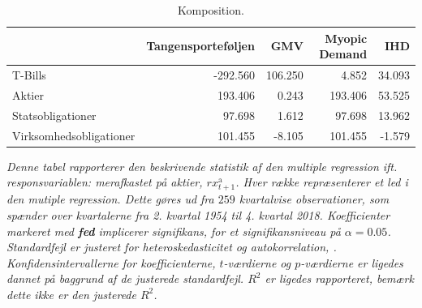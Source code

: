 \documentclass[
  a4paper,
  oneside]{memoir}
\begin{document}
\begin{table}[H]

\caption{\label{tab:AL-KOMP}Komposition.}
\centering
\begin{threeparttable}
\begin{tabular}[t]{lrrrr}
\toprule
  & Tangensporteføljen & GMV & Myopic Demand & IHD\\
\midrule
\rowcolor{gray!6}  T-Bills & -292.560 & 106.250 & 4.852 & 34.093\\
Aktier & 193.406 & 0.243 & 193.406 & 53.525\\
\rowcolor{gray!6}  Statsobligationer & 97.698 & 1.612 & 97.698 & 13.962\\
Virksomhedsobligationer & 101.455 & -8.105 & 101.455 & -1.579\\
\bottomrule
\end{tabular}
\begin{tablenotes}
\item \textit{Denne tabel rapporterer den beskrivende statistik af den multiple regression ift. responsvariablen: merafkastet på aktier, $rx_{t+1}^{\text{a}}$. Hver række repræsenterer et led i den mutiple regression. Dette gøres ud fra $259$ kvartalvise observationer, som spænder over kvartalerne fra 2. kvartal 1954 til 4. kvartal 2018. Koefficienter markeret med \textbf{fed} implicerer signifikans, for et signifikansniveau på $\alpha=0.05$. Standardfejl er justeret for heteroskedasticitet og autokorrelation, \citep{Newey1987}. Konfidensintervallerne for koefficienterne, $t$-værdierne og $p$-værdierne er ligedes dannet på baggrund af de justerede standardfejl. $R^2$ er ligedes rapporteret, bemærk dette ikke er den justerede $R^2$.}
\end{tablenotes}
\end{threeparttable}
\end{table}
\end{document}
